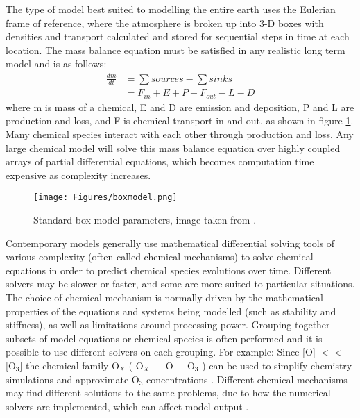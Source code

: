     
    The type of model best suited to modelling the entire earth uses the Eulerian frame of reference, where the atmosphere is broken up into 3-D boxes with densities and transport calculated and stored for sequential steps in time at each location.
    The mass balance equation must be satisfied in any realistic long term model and is as follows: 
    \begin{align*}
      \frac{dm}{dt} & = \sum{sources}-\sum{sinks} \\
                    & = F_{in} + E + P - F_{out} - L - D 
    \end{align*}
    where m is mass of a chemical, E and D are emission and deposition, P and L are production and loss, and F is chemical transport in and out, as shown in figure \ref{LR:Models:fig_boxmodel}.
    Many chemical species interact with each other through production and loss. 
    Any large chemical model will solve this mass balance equation over highly coupled arrays of partial differential equations, which becomes computation time expensive as complexity increases.
    
    \begin{figure}
      \texttt{[image: Figures/boxmodel.png]}
      \caption{ %
        Standard box model parameters, image taken from \textcite{Jacob_1999_book}. }
      \label{LR:Models:fig_boxmodel}
    \end{figure}
    
    Contemporary models generally use mathematical differential solving tools of various complexity (often called chemical mechanisms) to solve chemical equations in order to predict chemical species evolutions over time.
    Different solvers may be slower or faster, and some are more suited to particular situations.
    The choice of chemical mechanism is normally driven by the mathematical properties of the equations and systems being modelled (such as stability and stiffness), as well as limitations around processing power.
    Grouping together subsets of model equations or chemical species is often performed and it is possible to use different solvers on each grouping.
    For example: Since [O] $<<$ [O$_3$] the chemical family O$_X$ (  O$_X \equiv $ O $+$ O$_3$ ) can be used to simplify chemistry simulations and approximate O$_3$ concentrations \parencite[][Chapter 3]{BrasseurJacob2017}.
    Different chemical mechanisms may find different solutions to the same problems, due to how the numerical solvers are implemented, which can affect model output \parencite{Zhang2012}.
    
